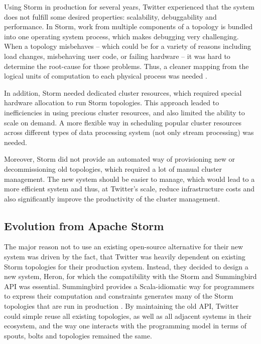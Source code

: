 \documentclass[conference]{IEEEtran}
\begin{document}
Using Storm in production for several years, Twitter experienced that the system does not fulfill some desired properties: scalability, debuggability and performance.
In Storm, work from multiple components of a topology is bundled into one operating system process, which makes debugging very challenging.
When a topology misbehaves – which could be for a variety of reasons including load changes, misbehaving user code, or failing hardware – it was hard to determine the root-cause for those problems.
Thus, a cleaner mapping from the logical units of computation to each physical process was needed \cite{TwitterHeronBlog, TwitterHeron}.

In addition, Storm needed dedicated cluster resources, which required special hardware allocation to run Storm topologies.
This approach leaded to inefficiencies in using precious cluster resources, and also limited the ability to scale on demand.
A more flexible way in scheduling popular cluster resources across different types of data processing system (not only stream processing) was needed.

Moreover, Storm did not provide an automated way of provisioning new or decommissioning old topologies, which required a lot of manual cluster management.
The new system should be easier to manage, which would lead to a more efficient system and thus, at Twitter's scale, reduce infrastructure costs and also significantly improve the productivity of the cluster management.

\subsection{Evolution from Apache Storm}
\label{sec:EvolutionFromApacheStorm}

The major reason not to use an existing open-source alternative for their new system was driven by the fact, that Twitter was heavily dependent on existing Storm topologies for their production system.
Instead, they decided to design a new system, Heron, for which the compatibility with the Storm and Summingbird API was essential.
Summingbird provides a Scala-idiomatic way for programmers to express their computation and constraints generates many of the Storm topologies that are run in production \cite{Summingbird}.
By maintaining the old API, Twitter could simple reuse all existing topologies, as well as all adjacent systems in their ecosystem, and the way one interacts with the programming model in terms of spouts, bolts and topologies remained the same.
\end{document}
